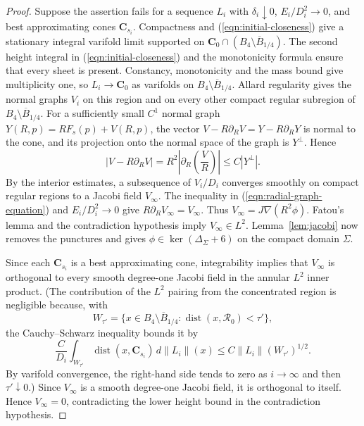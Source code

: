 \documentclass[11pt,a4paper]{article}
\numberwithin{equation}{section}
\theoremstyle{definition}
\theoremstyle{remark}
\newcommand{\dist}{\operatorname{dist}}
\newcommand{\dd}{\,d}
\begin{document}
	\begin{proof}
		Suppose the assertion fails for a sequence $L_i$ with $\delta_i\downarrow0$,
		$E_i/D_i^2\to0$,
		and best approximating cones $\mathbf C_{s_i}$.
		Compactness and (\ref{eqn:initial-closeness}) give a stationary integral
		varifold limit supported on $\mathbf C_0\cap(B_4\setminus\overline B_{1/4})$.
		The second height integral in (\ref{eqn:initial-closeness}) and the
		monotonicity formula ensure that every sheet is present. Constancy, monotonicity and the mass bound give multiplicity one, so
		$L_i\to\mathbf C_0$ as varifolds on $B_4\setminus\overline B_{1/4}$.
		Allard regularity gives the normal graphs $V_i$ on this region
		and on every other compact regular subregion of
		$B_4\setminus\overline B_{1/4}$.
		For a sufficiently small $C^1$ normal graph
		$Y(R,p)=RF_s(p)+V(R,p)$, the vector
		$V-R\partial_RV=Y-R\partial_RY$ is normal to the cone, and its
		projection onto the normal space of the graph is $Y^\perp$. Hence
		\begin{equation}\label{eqn:radial-graph-equation}
			|V-R\partial_RV|
			=R^2\left|\partial_R\left(\frac VR\right)\right|
			\le C|Y^\perp|.
		\end{equation}
		By the interior estimates, a subsequence of $V_i/D_i$ converges
		smoothly on compact regular regions to a Jacobi field $V_\infty$.
		The inequality in (\ref{eqn:radial-graph-equation}) and $E_i/D_i^2\to0$ give
		$R\partial_RV_\infty=V_\infty$. Thus $V_\infty=J\nabla(R^2\phi)$.
		Fatou's lemma and the contradiction hypothesis imply $V_\infty\in L^2$.
		Lemma~\ref{lem:jacobi} now removes the punctures and gives
		$\phi\in\ker(\Delta_\Sigma+6)$ on the compact domain $\Sigma$.
		
		Since each $\mathbf C_{s_i}$ is a best approximating cone, integrability
		implies that $V_\infty$ is orthogonal to every smooth degree-one Jacobi
		field in the annular $L^2$ inner product.
		(The contribution of the $L^2$ pairing from the concentrated region is negligible because,
		with
		\[
		W_{\tau'}=\{x\in B_4\setminus\overline B_{1/4}:
		\dist(x,\mathcal R_0)<\tau'\},
		\]
		the Cauchy--Schwarz inequality bounds it by
		\[
		\frac{C}{D_i}\int_{W_{\tau'}}\dist(x,\mathbf C_{s_i})\dd\|L_i\|(x)
		\le C\|L_i\|(W_{\tau'})^{1/2}.
		\]
		By varifold convergence, the right-hand side tends to zero as
		$i\to\infty$ and then $\tau'\downarrow0$.) Since $V_\infty$ is a smooth
		degree-one Jacobi field, it is orthogonal to itself. Hence
		$V_\infty=0$, contradicting the lower height bound in the contradiction hypothesis.
	\end{proof}
	
\end{document}
